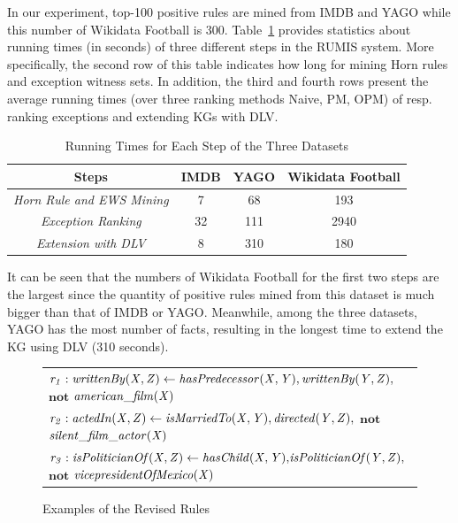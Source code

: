 In our experiment, top-100 positive rules are mined from IMDB and YAGO while this number of Wikidata Football is 300. Table~\ref{tab:run_time} provides statistics about running times (in seconds) of three different steps in the RUMIS system. More specifically, the second row of this table indicates how long for mining Horn rules and exception witness sets. In addition, the third and fourth rows present the average running times (over three ranking methods Naive, PM, OPM) of resp. ranking exceptions and extending KGs with DLV.

\begin{table}[ht]
\centering
\footnotesize{
\begin{tabular}{|c|ccc|}
\hline
\textbf{Steps} & \textbf{IMDB} & \textbf{YAGO} & \textbf{Wikidata Football}\\
\hline
 \textit{Horn Rule and EWS Mining} & 7 & 68 & 193\\
 \textit{Exception Ranking} & 32 & 111 & 2940\\
 \textit{Extension with DLV} & 8 & 310 & 180\\
 \hline 
\end{tabular}
}
\smallskip
\caption{Running Times for Each Step of the Three Datasets}
\label{tab:run_time}
\end{table}

It can be seen that the numbers of Wikidata Football for the first two steps are the largest since the quantity of positive rules mined from this dataset is much bigger than that of IMDB or YAGO. Meanwhile, among the three datasets, YAGO has the most number of facts, resulting in the longest time to extend the KG using DLV (310 seconds).

\begin{figure}[t]
    \centering
   
    \vspace{-.2cm}
    \begin{tabular}{l}
 {\scriptsize
        $\mathit{r_1: writtenBy(X, Z)}  \leftarrow
        \mathit{hasPredecessor(X, Y)},\mathit{writtenBy(Y, Z)},$ $ \textbf{not}$  $\mathit{american\_film(X)} $}\\        
       {\scriptsize 
$\mathit{r_2:  actedIn(X, Z)}  \leftarrow
        \mathit{isMarriedTo(X, Y)},\mathit{directed(Y, Z)},$ $ \textbf{not}$  $\mathit{silent\_film\_actor(X)} $} \\
          {\scriptsize 
$\mathit{r_3:  isPoliticianOf(X, Z)}  \leftarrow
        \mathit{hasChild(X, Y)}{,}\mathit{isPoliticianOf(Y, Z)}{,}$$ \textbf{not}$  $\mathit{vicepresidentOfMexico(X)} $} \\
 \end{tabular}            
    \caption{Examples of the Revised Rules}
 \label{fig:examplerules}
 \vspace{-.4cm}
\end{figure}


